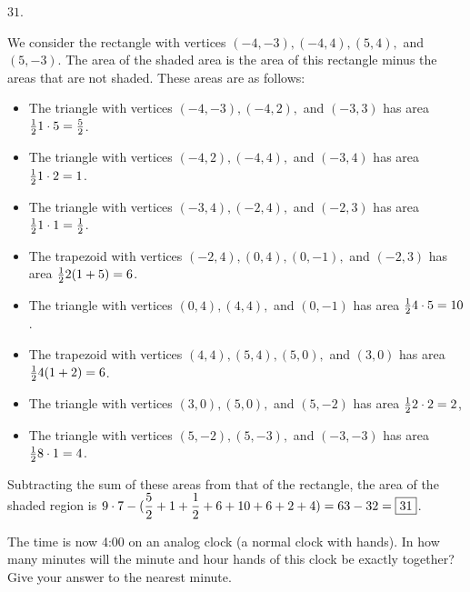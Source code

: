 \documentclass[11pt]{article}
\DeclareRobustCommand{\frac}[3][0pt]{%
  {\begingroup\hspace{#1}#2\hspace{#1}\endgroup\over\hspace{#1}#3\hspace{#1}}}
\begin{document}
\begin{answer} $\boxed{31}$. \end{answer}
\begin{solution}
We consider the rectangle with vertices $(-4, -3), (-4, 4), (5, 4),$ and $(5, -3)$. The area of the shaded area is the area of this rectangle minus the areas that are not shaded. These areas are as follows:
\begin{itemize}
	\item The triangle with vertices $(-4, -3), (-4, 2),$ and $(-3, 3)$ has area $\frac{1}{2} 1 \cdot 5 = \frac{5}{2}$.
	\item The triangle with vertices $(-4, 2), (-4, 4),$ and $(-3, 4)$ has area $\frac{1}{2} 1 \cdot 2 = 1$.
	\item The triangle with vertices $(-3, 4), (-2, 4),$ and $(-2, 3)$ has area $\frac{1}{2} 1 \cdot 1 = \frac{1}{2}$.
	\item The trapezoid with vertices $(-2, 4), (0, 4), (0, -1),$ and $(-2, 3)$ has area $\frac{1}{2} 2(1 + 5) = 6$.
	\item The triangle with vertices $(0, 4), (4, 4),$ and $(0, -1)$ has area $\frac{1}{2} 4 \cdot 5 = 10$.
	\item The trapezoid with vertices $(4, 4), (5, 4), (5, 0),$ and $(3, 0)$ has area $\frac{1}{2} 	4(1+2) = 6$.
	\item The triangle with vertices $(3, 0), (5, 0),$ and $(5, -2)$ has area $\frac{1}{2} 2 \cdot 2 = 2$,
	\item The triangle with vertices $(5, -2), (5, -3),$ and $(-3, -3)$ has area $\frac{1}{2} 8 \cdot 1 = 4$.
\end{itemize}
Subtracting the sum of these areas from that of the rectangle, the area of the shaded region is $\displaystyle 9 \cdot 7 - (\frac{5}{2} + 1 + \frac{1}{2} + 6 + 10 + 6 + 2 + 4) = 63 - 32 =\boxed{31}$.
\end{solution}

\begin{problem}The time is now 4:00 on an analog clock (a normal clock with hands). In how many minutes will the minute and hour hands of this clock be exactly together? Give your answer to the nearest minute. %
\end{problem}
\end{document}
